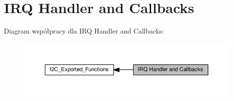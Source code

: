 \hypertarget{group___i2_c___i_r_q___handler__and___callbacks}{}\section{I\+RQ Handler and Callbacks}
\label{group___i2_c___i_r_q___handler__and___callbacks}
Diagram współpracy dla I\+RQ Handler and Callbacks\+:\nopagebreak
\begin{figure}[H]
\begin{center}
\leavevmode
\includegraphics[width=350pt]{group___i2_c___i_r_q___handler__and___callbacks}
\end{center}
\end{figure}
